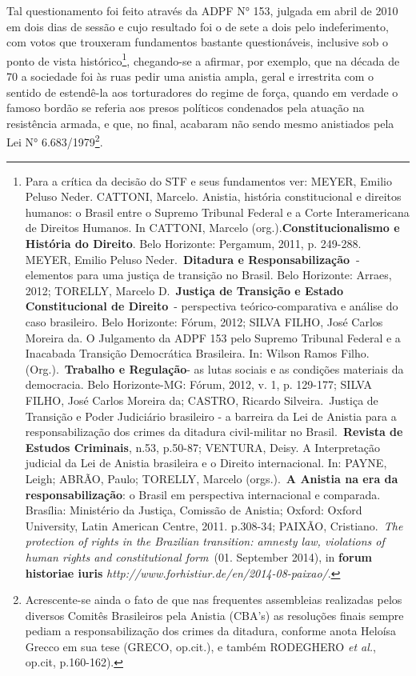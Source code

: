 Tal questionamento foi feito através da ADPF N° 153, julgada em abril de
2010 em dois dias de sessão e cujo resultado foi o de sete a dois pelo
indeferimento, com votos que trouxeram fundamentos bastante
questionáveis, inclusive sob o ponto de vista histórico\footnote{Para a
  crítica da decisão do STF e seus fundamentos ver: MEYER, Emilio Peluso
  Neder. CATTONI, Marcelo. Anistia, história constitucional e direitos
  humanos: o Brasil entre o Supremo Tribunal Federal e a Corte
  Interamericana de Direitos Humanos. In CATTONI, Marcelo
  (org.).\textbf{Constitucionalismo e História do Direito}. Belo
  Horizonte: Pergamum, 2011, p. 249-288. MEYER, Emilio Peluso
  Neder.~\textbf{Ditadura e Responsabilização~}- elementos para uma
  justiça de transição no Brasil. Belo Horizonte: Arraes, 2012; TORELLY,
  Marcelo D.~\textbf{Justiça de Transição e Estado Constitucional de
  Direito}~- perspectiva teórico-comparativa e análise do caso
  brasileiro. Belo Horizonte: Fórum, 2012; SILVA FILHO, José Carlos
  Moreira da. O Julgamento da ADPF 153 pelo Supremo Tribunal Federal e a
  Inacabada Transição Democrática Brasileira. In: Wilson Ramos Filho.
  (Org.).~\textbf{Trabalho e Regulação}- as lutas sociais e as condições
  materiais da democracia. Belo Horizonte-MG: Fórum, 2012, v. 1, p.
  129-177; SILVA FILHO, José Carlos Moreira da; CASTRO, Ricardo
  Silveira.~Justiça de Transição e Poder Judiciário brasileiro - a
  barreira da Lei de Anistia para a responsabilização dos crimes da
  ditadura civil-militar no Brasil.~\textbf{Revista de Estudos
  Criminais}, n.53, p.50-87; VENTURA, Deisy. A Interpretação judicial da
  Lei de Anistia brasileira e o Direito internacional. In: PAYNE, Leigh;
  ABRÃO, Paulo; TORELLY, Marcelo (orgs.).~\textbf{A Anistia na era da
  responsabilização}: o Brasil em perspectiva internacional e comparada.
  Brasília: Ministério da Justiça, Comissão de Anistia; Oxford: Oxford
  University, Latin American Centre, 2011. p.308-34; PAIXÃO,
  Cristiano.~\emph{The protection of rights in the Brazilian transition:
  amnesty law, violations of human rights and constitutional form}~(01.
  September 2014), in \textbf{forum historiae
  iuris} \emph{http://www.forhistiur.de/en/2014-08-paixao/}.},
chegando-se a afirmar, por exemplo, que na década de 70 a sociedade foi
às ruas pedir uma anistia ampla, geral e irrestrita com o sentido de
estendê-la aos torturadores do regime de força, quando em verdade o
famoso bordão se referia aos presos políticos condenados pela atuação na
resistência armada, e que, no final, acabaram não sendo mesmo anistiados
pela Lei N° 6.683/1979\footnote{Acrescente-se ainda o fato de que nas
  frequentes assembleias realizadas pelos diversos Comitês Brasileiros
  pela Anistia (CBA's) as resoluções finais sempre pediam a
  responsabilização dos crimes da ditadura, conforme anota Heloísa
  Grecco em sua tese (GRECO, op.cit.), e também RODEGHERO \emph{et al.},
  op.cit, p.160-162).}.

